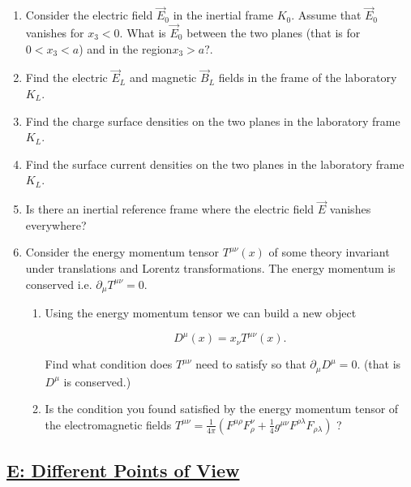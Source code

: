 \begin{enumerate}
	\item Consider the electric field $\vec{E}_{0}$ in the inertial frame $K_{0}$. Assume that $\vec{E}_{0}$ vanishes for $x_{3}<0 .$ What is $\vec{E}_{0}$ between the two planes (that is for $0<x_{3}<a$) and in the region$x_{3}>a ?$.
	\item Find the electric $\vec{E}_{L}$ and magnetic $\vec{B}_{L}$ fields in the frame of the laboratory $K_{L}$.
	\item Find the charge surface densities on the two planes in the laboratory frame $K_{L}$.
	\item Find the surface current densities on the two planes in the laboratory frame $K_{L}$.
	\item Is there an inertial reference frame where the electric field $\vec{E}$ vanishes everywhere?
	\item Consider the energy momentum tensor $T^{\mu \nu}(x)$ of some theory invariant under translations and Lorentz transformations. The energy momentum is conserved i.e. $\partial_{\mu} T^{\mu \nu}=0$.
	
	\begin{enumerate}
		\item Using the energy momentum tensor we can build a new object
		
		\begin{equation}
			D^{\mu}(x)=x_{\nu} T^{\mu \nu}(x).
		\end{equation}

		Find what condition does $T^{\mu \nu}$ need to satisfy so that $\partial_{\mu} D^{\mu}=0$. (that is $D^{\mu}$ is conserved.)
		\item Is the condition you found satisfied by the energy momentum tensor of the electromagnetic fields $T^{\mu \nu}=\frac{1}{4 \pi}\left(F^{\mu \rho} F_{\rho}^{\nu}+\frac{1}{4} g^{\mu \nu} F^{\rho \lambda} F_{\rho \lambda}\right)$ ?
	\end{enumerate}
\end{enumerate}

\subsection{\hyperref[E: Different Points of View]{E: Different Points of View}}

